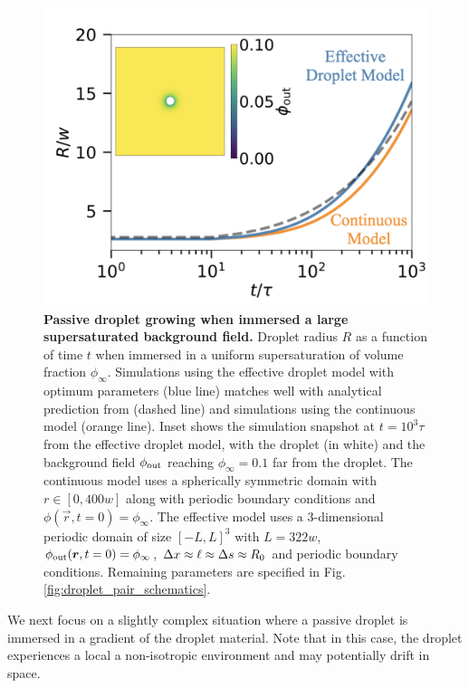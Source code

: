 \begin{figure}[tb]
\centering
\includegraphics[scale=0.4]{MainContent/Figures/single_passive_droplet_growth.pdf}
\caption{
\textbf{Passive droplet growing when immersed a large supersaturated background field.}
Droplet radius $R$ as a function of time $t$ when immersed in a uniform supersaturation of volume fraction $\phi_\infty$.
Simulations using the effective droplet model with optimum parameters (blue line) matches well with analytical prediction from  (dashed line) and simulations using the continuous model (orange line).
Inset shows the simulation snapshot at $t = 10^3 \tau$ from the effective droplet model, with the droplet (in white) and the background field $\phi_\mathrm{out}$ reaching $\phi_\infty = 0.1$ far from the droplet.
The continuous model uses a spherically symmetric domain with $r \in [0, 400 w]$ along with periodic boundary conditions and $\phi(\vec{r}, t=0) = \phi_\infty$.
The effective model uses a $3$-dimensional periodic domain of size $[-L, L]^3$ with $L = 322 w$, $\phi_\mathrm{out}(\boldsymbol{r}, t=0) = \phi_\infty$, $\Delta x \approx \ell \approx \Delta s \approx R_0$ and periodic boundary conditions.
Remaining parameters are specified in Fig. \ref{fig:droplet_pair_schematics}.
}
\label{fig:passive_droplet}
\end{figure}

We next focus on a slightly complex situation where a passive droplet is immersed in a gradient of the droplet material.
Note that in this case, the droplet experiences a local a non-isotropic environment and may potentially drift in space.

